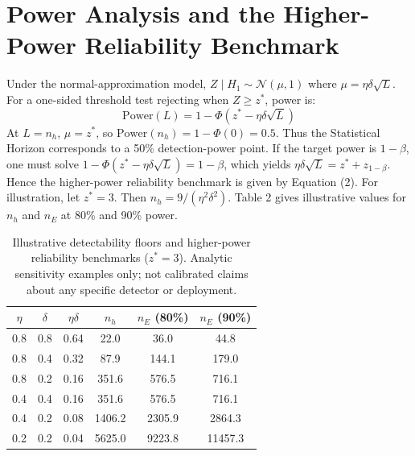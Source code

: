 \documentclass[11pt]{article}
\begin{document}
\section{Power Analysis and the Higher-Power Reliability Benchmark}
Under the normal-approximation model, $Z \mid H_1 \sim \mathcal{N}(\mu, 1)$ where
$\mu = \eta\delta\sqrt{L}$. For a one-sided threshold test rejecting when $Z \geq
z^*$, power is:
\begin{equation}
\mathrm{Power}(L) = 1 - \Phi(z^* - \eta\delta\sqrt{L})
\end{equation}
At $L = n_h$, $\mu = z^*$, so $\mathrm{Power}(n_h) = 1 - \Phi(0) = 0.5$. Thus the
Statistical Horizon corresponds to a 50\% detection-power point.
If the target power is $1-\beta$, one must solve $1 - \Phi(z^* - \eta\delta\sqrt{L})
= 1-\beta$, which yields $\eta\delta\sqrt{L} = z^* + z_{1-\beta}$. Hence the
higher-power reliability benchmark is given by Equation (2).
For illustration, let $z^* = 3$. Then $n_h = 9/(\eta^2\delta^2)$. Table 2 gives
illustrative values for $n_h$ and $n_E$ at 80\% and 90\% power.
\begin{table}[h]
\centering
\caption{Illustrative detectability floors and higher-power reliability benchmarks
($z^* = 3$). Analytic sensitivity examples only; not calibrated claims about any
specific detector or deployment.}
\begin{tabular}{cccccc}
\toprule
$\eta$ & $\delta$ & $\eta\delta$ & $n_h$ & $n_E$ (80\%) & $n_E$ (90\%)\\
\midrule
0.8 & 0.8 & 0.64 & 22.0 & 36.0 & 44.8\\
0.8 & 0.4 & 0.32 & 87.9 & 144.1 & 179.0\\
0.8 & 0.2 & 0.16 & 351.6 & 576.5 & 716.1\\
0.4 & 0.4 & 0.16 & 351.6 & 576.5 & 716.1\\
0.4 & 0.2 & 0.08 & 1406.2 & 2305.9 & 2864.3\\
0.2 & 0.2 & 0.04 & 5625.0 & 9223.8 & 11457.3\\
\bottomrule
\end{tabular}
\end{table}
\end{document}

